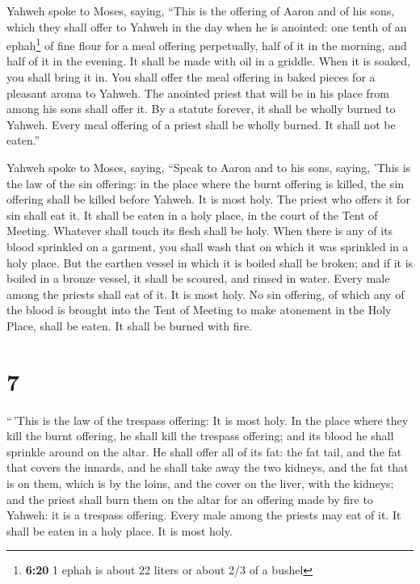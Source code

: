  Yahweh spoke to Moses, saying,  ``This is
the offering of Aaron and of his sons, which they shall offer to Yahweh
in the day when he is anointed: one tenth of an ephah\footnote{\textbf{6:20}
  1 ephah is about 22 liters or about 2/3 of a bushel} of fine flour for
a meal offering perpetually, half of it in the morning, and half of it
in the evening.  It shall be made with oil in a griddle.
When it is soaked, you shall bring it in. You shall offer the meal
offering in baked pieces for a pleasant aroma to Yahweh. 
The anointed priest that will be in his place from among his sons shall
offer it. By a statute forever, it shall be wholly burned to Yahweh.
 Every meal offering of a priest shall be wholly burned.
It shall not be eaten.''

 Yahweh spoke to Moses, saying,  ``Speak
to Aaron and to his sons, saying, 'This is the law of the sin offering:
in the place where the burnt offering is killed, the sin offering shall
be killed before Yahweh. It is most holy.  The priest who
offers it for sin shall eat it. It shall be eaten in a holy place, in
the court of the Tent of Meeting.  Whatever shall touch
its flesh shall be holy. When there is any of its blood sprinkled on a
garment, you shall wash that on which it was sprinkled in a holy place.
 But the earthen vessel in which it is boiled shall be
broken; and if it is boiled in a bronze vessel, it shall be scoured, and
rinsed in water.  Every male among the priests shall eat
of it. It is most holy.  No sin offering, of which any of
the blood is brought into the Tent of Meeting to make atonement in the
Holy Place, shall be eaten. It shall be burned with fire.

\hypertarget{section-6}{%
\section{7}\label{section-6}}

 ``\,'This is the law of the trespass offering: It is most
holy.  In the place where they kill the burnt offering, he
shall kill the trespass offering; and its blood he shall sprinkle around
on the altar.  He shall offer all of its fat: the fat
tail, and the fat that covers the innards,  and he shall
take away the two kidneys, and the fat that is on them, which is by the
loins, and the cover on the liver, with the kidneys;  and
the priest shall burn them on the altar for an offering made by fire to
Yahweh: it is a trespass offering.  Every male among the
priests may eat of it. It shall be eaten in a holy place. It is most
holy.

